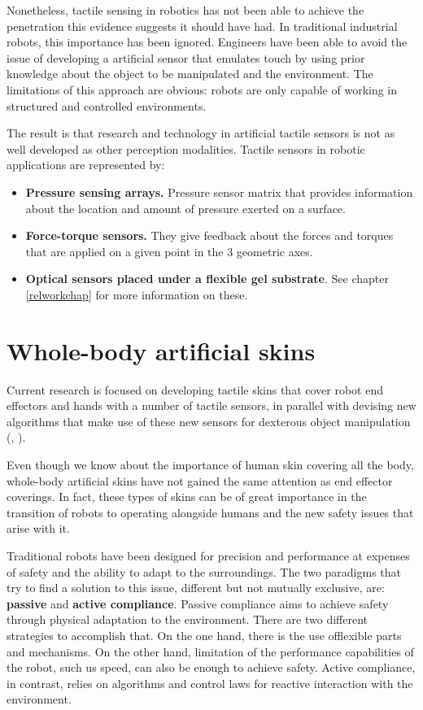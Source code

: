 Nonetheless, tactile sensing in robotics has not been able to achieve the penetration this evidence suggests it should have had. In traditional industrial robots, this importance has been ignored. Engineers have been able to avoid the issue of developing a artificial sensor that emulates touch by using prior knowledge about the object to be manipulated and the environment. The limitations of this approach are obvious: robots are only capable of working in structured and controlled environments.

The result is that research and technology in artificial tactile sensors is not as well developed as other perception modalities. Tactile sensors in robotic applications are represented by:

\begin{itemize}
    \item\textbf{Pressure sensing arrays.} Pressure sensor matrix that provides information about the location and amount of pressure exerted on a surface.
    \item\textbf{Force-torque sensors.} They give feedback about the forces and torques that are applied on a given point in the 3 geometric axes.
    \item\textbf{Optical sensors placed under a flexible gel substrate}. See chapter \ref{relworkchap} for more information on these.
\end{itemize}

\section{Whole-body artificial skins}
Current research is focused on developing tactile skins that cover robot end effectors and hands with a number of tactile sensors, in parallel with devising new algorithms that make use of these new sensors for dexterous object manipulation (\cite{tianFeel}, \cite{wilson2020design}).

Even though we know about the importance of human skin covering all the body, whole-body artificial skins have not gained the same attention as end effector coverings. In fact, these types of skins can be of great importance in the transition of robots to operating alongside humans and the new safety issues that arise with it.

Traditional robots have been designed for precision and performance at expenses of safety and the ability to adapt to the surroundings. The two paradigms that try to find a solution to this issue, different but not mutually exclusive, are: \textbf{passive} and \textbf{active compliance}.  Passive compliance aims to achieve safety through physical adaptation to the environment. There are two different strategies to accomplish that. On the one hand, there is the use offlexible parts and mechanisms. On the other hand, limitation of the performance capabilities of the robot, such us speed, can also be enough to achieve safety. Active compliance, in contrast, relies on algorithms and control laws for reactive interaction with the environment.

